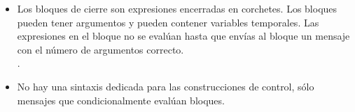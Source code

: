 \documentclass[a4paper,10pt,twoside]{book}
\begin{document}
\begin{itemize}
\item	Los bloques de cierre son expresiones encerradas en corchetes.
		Los bloques pueden tener argumentos y pueden contener variables temporales.
		Las expresiones en el bloque no se evalúan hasta que envías al bloque un mensaje
		 con el número de argumentos correcto.\\
		.

\item	No hay una sintaxis dedicada para las construcciones de control, sólo mensajes que condicionalmente evalúan bloques.\\

\end{itemize}

\ifx\wholebook\relax\else
\end{document}
